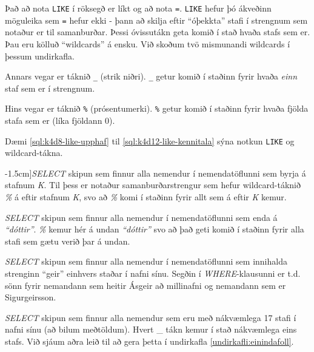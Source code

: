 Það að nota \verb|LIKE| í röksegð er líkt og að nota \verb|=|. \verb|LIKE| hefur þó ákveðinn möguleika sem \verb|=| hefur ekki - þann að skilja eftir ``óþekkta'' stafi í strengnum sem notaður er til samanburðar. Þessi óvissutákn geta komið í stað hvaða stafs sem er. Þau eru kölluð ``wildcards'' á ensku. Við skoðum tvö mismunandi wildcards í þessum undirkafla. 

Annars vegar er táknið \verb|_| (strik niðri). \verb|_| getur komið í staðinn fyrir hvaða \emph{einn} staf sem er í strengnum.

Hins vegar er táknið \verb|%| (prósentumerki). \verb|%| getur komið í staðinn fyrir hvaða fjölda stafa sem er (líka fjöldann $0$).

Dæmi \ref{sql:k4d8-like-upphaf} til \ref{sql:k4d12-like-kennitala} sýna notkun \verb|LIKE| og wildcard-tákna.

\begin{example}
\caption[LIKE til að finna orð sem byrja á sama staf][-1.5cm]{\emph{SELECT} skipun sem finnur alla nemendur í nemendatöflunni sem byrja á stafnum \emph{K}. Til þess er notaður samanburðarstrengur sem hefur wildcard-táknið \emph{\%} á eftir stafnum \emph{K}, svo að \emph{\%} komi í staðinn fyrir allt sem á eftir \emph{K} kemur.}
\label{sql:k4d8-like-upphaf}
\centering
{}
\end{example}

\begin{example}
\caption[LIKE til að finna orð sem enda eins]{\emph{SELECT} skipun sem finnur alla nemendur í nemendatöflunni sem enda á \emph{``dóttir''}. \emph{\%} kemur hér á undan \emph{``dóttir''} svo að það geti komið í staðinn fyrir alla stafi sem gætu verið þar á undan.}
\label{sql:k4d9-like-lok}
\centering
{}
\end{example}

\begin{example}
\caption[LIKE einhvers staðar í streng]{\emph{SELECT} skipun sem finnur alla nemendur í nemendatöflunni sem innihalda strenginn ``geir'' einhvers staðar í nafni sínu. Segðin í \emph{WHERE}-klausunni er t.d. sönn fyrir nemandann sem heitir Ásgeir að millinafni og nemandann sem er Sigurgeirsson.}
\label{sql:k4d10-like-midja}
\centering
{}
\vspace{2cm}
\end{example}

\begin{example}
\caption[LIKE til að finna strengi af ákveðinni lengd]{\emph{SELECT} skipun sem finnur alla nemendur sem eru með nákvæmlega 17 stafi í nafni sínu (að bilum meðtöldum). Hvert \_ tákn kemur í stað nákvæmlega eins stafs. Við sjáum aðra leið til að gera þetta í undirkafla \ref{undirkafli:einindafoll}.}
\label{sql:k4d11-like-nakvaemt}
\centering
{}
\vspace{1cm}
\end{example}

